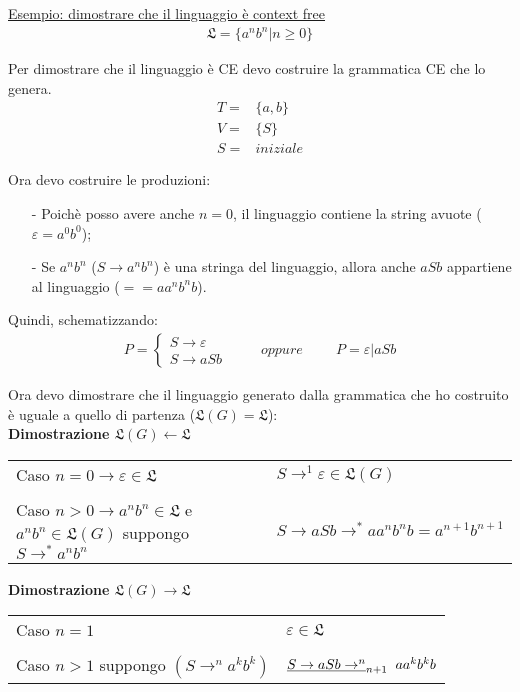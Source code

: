 \documentclass[a4paper, 10pt]{report}
\begin{document}
\noindent \underline{Esempio: dimostrare che il linguaggio è context free}
\begin{align*}
\mathfrak{L} = \{ a^n b^n | n \ge 0\}
\end{align*}

\noindent Per dimostrare che il linguaggio è CE devo costruire la grammatica CE che lo genera.
\begin{align*}
T =& \{ a, b \}\\
V =& \{ S\}\\
S =& iniziale
\end{align*}

\noindent Ora devo costruire le produzioni:
\begin{itemize}
\item[-] Poichè posso avere anche $n = 0$, il linguaggio contiene la string avuote ($\varepsilon = a^0b^0$);
\item[-] Se $ a^nb^n$ ($S \rightarrow a^nb^n$) è una stringa del linguaggio, allora anche $aSb$ appartiene al linguaggio ($== aa^nb^nb$).
\end{itemize}

\noindent Quindi, schematizzando:
\begin{align*}
P =
\begin{cases} 
S \rightarrow \varepsilon \\ 
S \rightarrow aSb
\end{cases} 
\hspace{1cm} oppure \hspace{1cm} P = \varepsilon | aSb
\end{align*}

\noindent Ora devo dimostrare che il linguaggio generato dalla grammatica che ho costruito è uguale a quello di partenza ($\mathfrak{L}(G) = \mathfrak{L}$):\\

\noindent \textbf{Dimostrazione $\mathfrak{L}(G) \leftarrow \mathfrak{L}$}

\begin{longtable}{p{} p{}}
Caso $n = 0 \rightarrow \varepsilon \in \mathfrak{L}$ & $S \rightarrow^1 \varepsilon \in \mathfrak{L}(G)$
\\\\
Caso $n > 0 \rightarrow a^nb^n \in \mathfrak{L}$ e $a^nb^n \in \mathfrak{L}(G)$ suppongo $S \rightarrow^* a^nb^n$ & $S \rightarrow aSb \rightarrow^* aa^nb^nb = a^{n+1}b^{n+1}$
\end{longtable}

\noindent \textbf{Dimostrazione $\mathfrak{L}(G) \rightarrow \mathfrak{L}$}
\begin{longtable}{p{} p{}}
Caso $n = 1 $ & $ \varepsilon \in \mathfrak{L}$
\\\\
Caso $n > 1 $ suppongo $ (S \rightarrow^n a^kb^k)$ & $\underline{S \rightarrow aSb \rightarrow^n}_{n+1} \hspace{0.2cm} aa^kb^kb$
\end{longtable}
\end{document}
